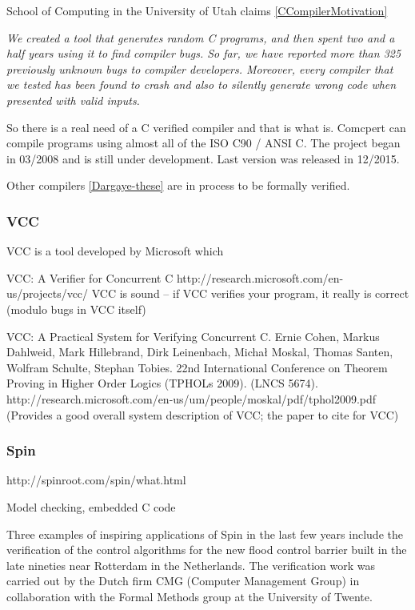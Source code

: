 School of Computing in the University of Utah claims \ref{CCompilerMotivation}

\textit{We created a tool that generates random C programs, and then spent two and a half years using it to find compiler bugs. So far, we have reported more than 325 previously unknown bugs to compiler developers. Moreover, every compiler that we tested has been found to crash and also to silently generate wrong code when presented with valid inputs.}

So there is a real need of a C verified compiler and that is what  is. 
%
Comcpert can compile programs using almost all of the ISO C90 / ANSI C. The project began in 03/2008 and is still under development. Last version was released in 12/2015.

Other compilers \ref{Dargaye-these} are in process to be formally verified.


\subsubsection{VCC}

\gls{VCC} is a tool developed by Microsoft which 

VCC: A Verifier for Concurrent C  http://research.microsoft.com/en-us/projects/vcc/
VCC is sound -- if VCC verifies your program, it really is correct (modulo bugs in VCC itself)

VCC: A Practical System for Verifying Concurrent C. Ernie Cohen, Markus Dahlweid, Mark Hillebrand, Dirk Leinenbach, Michał Moskal, Thomas Santen, Wolfram Schulte, Stephan Tobies. 22nd International Conference on Theorem Proving in Higher Order Logics (TPHOLs 2009). (LNCS 5674). http://research.microsoft.com/en-us/um/people/moskal/pdf/tphol2009.pdf (Provides a good overall system description of VCC; the paper to cite for VCC)


\subsubsection{Spin}

http://spinroot.com/spin/what.html

Model checking, embedded C code

Three examples of inspiring applications of Spin in the last few years include the verification of the control algorithms for the new flood control barrier built in the late nineties near Rotterdam in the Netherlands. The verification work was carried out by the Dutch firm CMG (Computer Management Group) in collaboration with the Formal Methods group at the University of Twente.



